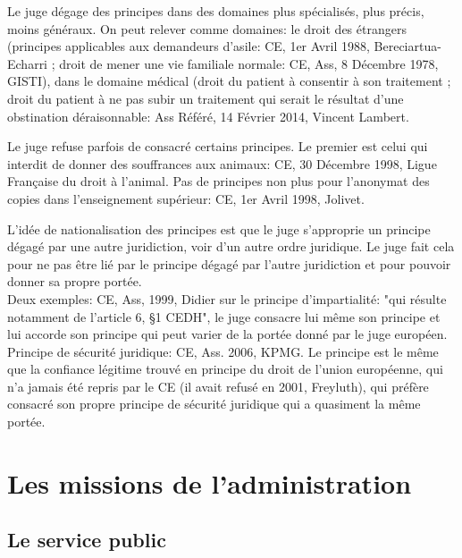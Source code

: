 \documentclass[10pt, a4paper, openany]{book}
\begin{document}
Le juge dégage des principes dans des domaines plus spécialisés, plus précis, moins généraux. On peut relever comme domaines: le droit des étrangers (principes applicables aux demandeurs d'asile: CE, 1er Avril 1988, Bereciartua-Echarri ; droit de mener une vie familiale normale: CE, Ass, 8 Décembre 1978, GISTI), dans le domaine médical (droit du patient à consentir à son traitement ; droit du patient à ne pas subir un traitement qui serait le résultat d'une obstination déraisonnable: Ass Référé, 14 Février 2014, Vincent Lambert.  


Le juge refuse parfois de consacré certains principes. Le premier est celui qui interdit de donner des souffrances aux animaux: CE, 30 Décembre 1998, Ligue Française du droit à l'animal. Pas de principes non plus pour l'anonymat des copies dans l'enseignement supérieur: CE, 1er Avril 1998, Jolivet. 


L'idée de nationalisation des principes est que le juge s'approprie un principe dégagé par une autre juridiction, voir d'un autre ordre juridique. Le juge fait cela pour ne pas être lié par le principe dégagé par l'autre juridiction et pour pouvoir donner sa propre portée. \\
Deux exemples: CE, Ass, 1999, Didier sur le principe d'impartialité: "qui résulte notamment de l'article 6, §1 CEDH", le juge consacre lui même son principe et lui accorde son principe qui peut varier de la portée donné par le juge européen. \\
Principe de sécurité juridique: CE, Ass. 2006, KPMG. Le principe est le même que la confiance légitime trouvé en principe du droit de l'union européenne, qui n'a jamais été repris par le CE (il avait refusé en 2001, Freyluth), qui préfère consacré son propre principe de sécurité juridique qui a quasiment la même portée. 


\part{Les missions de l'administration}

\chapter{Le service public}
\end{document}

